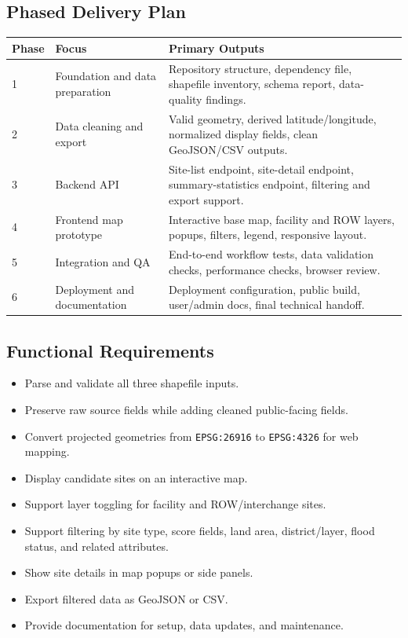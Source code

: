 \documentclass[11pt]{article}
\newcommand{\code}[1]{\nolinkurl{#1}}
\begin{document}
\subsection{Phased Delivery Plan}

\begin{longtable}{L{0.18\textwidth} L{0.28\textwidth} L{0.44\textwidth}}
\toprule
\textbf{Phase} & \textbf{Focus} & \textbf{Primary Outputs} \\
\midrule
{} & Foundation and data preparation & Repository structure, dependency file, shapefile inventory, schema report, data-quality findings. \\
2 & Data cleaning and export & Valid geometry, derived latitude/longitude, normalized display fields, clean GeoJSON/CSV outputs. \\
3 & Backend API & Site-list endpoint, site-detail endpoint, summary-statistics endpoint, filtering and export support. \\
4 & Frontend map prototype & Interactive base map, facility and ROW layers, popups, filters, legend, responsive layout. \\
5 & Integration and QA & End-to-end workflow tests, data validation checks, performance checks, browser review. \\
6 & Deployment and documentation & Deployment configuration, public build, user/admin docs, final technical handoff. \\
\bottomrule
\end{longtable}

\subsection{Functional Requirements}

\begin{itemize}
  \item Parse and validate all three shapefile inputs.
  \item Preserve raw source fields while adding cleaned public-facing fields.
  \item Convert projected geometries from \code{EPSG:26916} to \code{EPSG:4326} for web mapping.
  \item Display candidate sites on an interactive map.
  \item Support layer toggling for facility and ROW/interchange sites.
  \item Support filtering by site type, score fields, land area, district/layer, flood status, and related attributes.
  \item Show site details in map popups or side panels.
  \item Export filtered data as GeoJSON or CSV.
  \item Provide documentation for setup, data updates, and maintenance.
\end{itemize}
\end{document}
